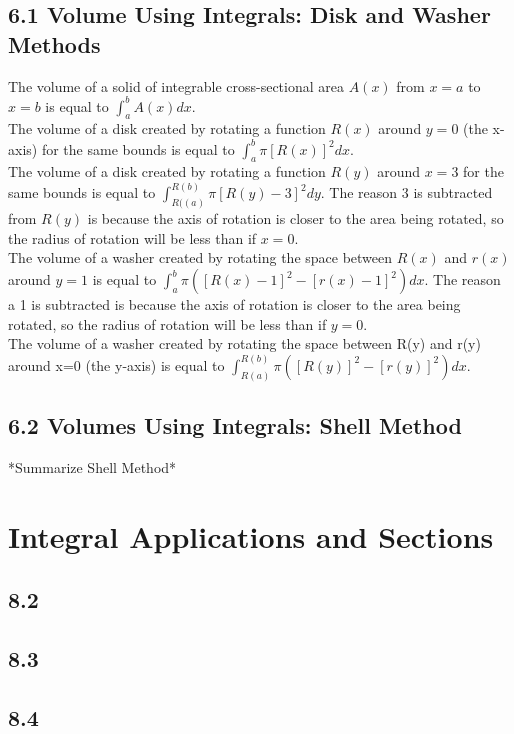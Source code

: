\documentclass{article}
\begin{document}
        \subsection*{6.1 Volume Using Integrals: Disk and Washer Methods}
            The volume of a solid of integrable cross-sectional area $A(x)$ from $x=a$ to $x=b$ is equal to $\int_{a}^{b} A(x)dx$. \\
            The volume of a disk created by rotating a function $R(x)$ around $y=0$ (the x-axis) for the same bounds is equal to $\int_{a}^{b} \pi [R(x)]^2 dx$. \\
            The volume of a disk created by rotating a function $R(y)$ around $x=3$ for the same bounds is equal to $\int_{R((a)}^{R(b)} \pi [R(y)-3]^2 dy$. The reason 3 is subtracted from $R(y)$ is because the axis of rotation is closer to the area being rotated, so the radius of rotation will be less than if $x=0$.\\
            The volume of a washer created by rotating the space between $R(x)$ and $r(x)$ around $y=1$ is equal to $\int_{a}^{b} \pi ([R(x) - 1]^2 - [r(x) - 1]^2) dx$. The reason a 1 is subtracted is because the axis of rotation is closer to the area being rotated, so the radius of rotation will be less than if $y=0$. \\
            The volume of a washer created by rotating the space between R(y) and r(y) around x=0 (the y-axis) is equal to $\int_{R(a)}^{R(b)} \pi ([R(y)]^2 - [r(y)]^2) dx$. \\
        \color{Orange}
        \subsection*{6.2 Volumes Using Integrals: Shell Method}
            *Summarize Shell Method*
        \color{Black}
    \section{Integral Applications and Sections}
        \subsection*{8.2}
        \subsection*{8.3}
        \subsection*{8.4}
\end{document}
